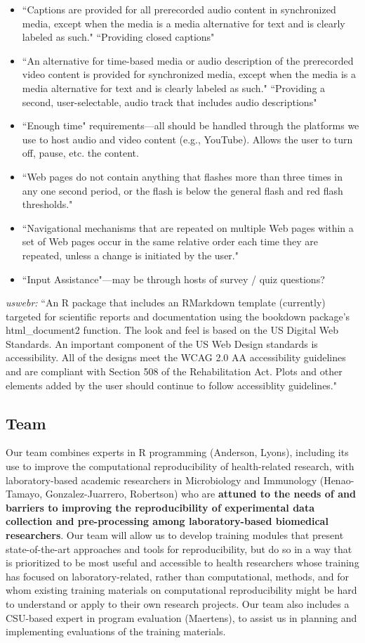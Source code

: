 \documentclass[pdftex,english,11pt,parskip=half]{scrartcl}
\begin{document}
\begin{itemize}
\item ``Captions are provided for all prerecorded audio content in synchronized media, except when the media is a media alternative for text and is clearly labeled as such." ``Providing closed captions"
\item ``An alternative for time-based media or audio description of the prerecorded video content is provided for synchronized media, except when the media is a media alternative for text and is clearly labeled as such." ``Providing a second, user-selectable, audio track that includes audio descriptions"
\item ``Enough time" requirements---all should be handled through the platforms we use to host audio and video content (e.g., YouTube). Allows the user to turn off, pause, etc. the content.
\item ``Web pages do not contain anything that flashes more than three times in any one second period, or the flash is below the general flash and red flash thresholds."
\item ``Navigational mechanisms that are repeated on multiple Web pages within a set of Web pages occur in the same relative order each time they are repeated, unless a change is initiated by the user."
\item ``Input Assistance"---may be through hosts of survey / quiz questions?
\end{itemize}

\textit{uswebr:} ``An R package that includes an RMarkdown template (currently) targeted for scientific reports and documentation using the bookdown package's html\_document2 function. The look and feel is based on the US Digital Web Standards. An important component of the US Web Design standards is accessibility. All of the designs meet the WCAG 2.0 AA accessibility guidelines and are compliant with Section 508 of the Rehabilitation Act. Plots and other elements added by the user should continue to follow accessiblity guidelines."

\subsection{Team}

Our team combines experts in R programming (Anderson, Lyons), including its use to improve the computational reproducibility of health-related research, with laboratory-based academic researchers in Microbiology and Immunology (Henao-Tamayo, Gonzalez-Juarrero, Robertson) who are \textbf{attuned to the needs of and barriers to improving the reproducibility of experimental data collection and pre-processing among laboratory-based biomedical researchers}. Our team will allow us to develop training modules that present state-of-the-art approaches and tools for reproducibility, but do so in a way that is prioritized to be most useful and accessible to health researchers whose training has focused on laboratory-related, rather than computational, methods, and for whom existing training materials on computational reproducibility might be hard to understand or apply to their own research projects. Our team also includes a CSU-based expert in program evaluation (Maertens), to assist us in planning and implementing evaluations of the training materials.
\end{document}
